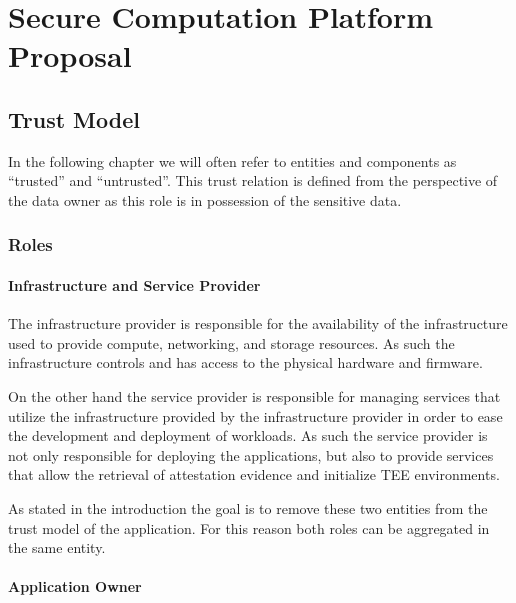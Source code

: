 
\chapter{Secure Computation Platform Proposal}
\label{ch:proposal}

\section{Trust Model}
\label{sec:trust-model}

In the following chapter we will often refer to entities and components as
``trusted'' and ``untrusted''. This trust relation is defined from the
perspective of the data owner as this role is in possession of the sensitive
data.

\subsection{Roles}

\subsubsection{Infrastructure and Service Provider}

The infrastructure provider is responsible for the availability of the
infrastructure used to provide compute, networking, and storage resources. As
such the infrastructure controls and has access to the physical hardware and
firmware.

On the other hand the service provider is responsible for managing services that
utilize the infrastructure provided by the infrastructure provider in order to
ease the development and deployment of workloads. As such the service provider
is not only responsible for deploying the applications, but also to provide
services that allow the retrieval of attestation evidence and initialize TEE
environments.

As stated in the introduction the goal is to remove these two entities from the
trust model of the application. For this reason both roles can be aggregated in
the same entity.

\subsubsection{Application Owner}

